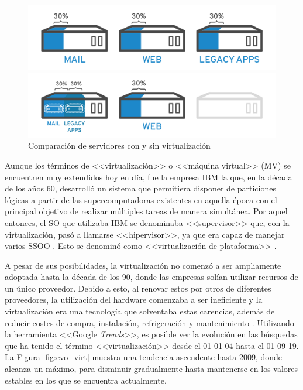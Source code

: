 \begin{figure}
    \centering
    \begin{minipage}{.5\textwidth}
        \centering
        \includegraphics[width=0.9\linewidth]{figures/images/serv_s_virt.png}
    \end{minipage}%
    \begin{minipage}{.5\textwidth}
        \centering
        \includegraphics[width=0.9\linewidth]{figures/images/serv_c_virt.png}
    \end{minipage}
    \caption{Comparación de servidores con y sin virtualización}
    \label{fig:ejemplo_virtu}
\end{figure}

Aunque los términos de <<virtualización>> o <<máquina virtual>> (\acs{MV}) se encuentren muy extendidos hoy en día, fue la empresa IBM la que, en la década de los años 60, desarrolló un sistema que permitiera disponer de particiones lógicas a partir de las supercomputadoras existentes en aquella época con el principal objetivo de realizar múltiples tareas de manera simultánea. Por aquel entonces, el \acf{SO} que utilizaba IBM se denominaba <<supervisor>> que, con la virtualización, pasó a llamarse <<hipervisor>>, ya que era capaz de manejar varios SSOO \cite{josemariagris2012}. Esto se denominó como <<virtualización de plataforma>> \cite{mtimjones2011}.

A pesar de sus posibilidades, la virtualización no comenzó a ser ampliamente adoptada hasta la década de los 90, donde las empresas solían utilizar recursos de un único proveedor. Debido a esto, al renovar estos por otros de diferentes proveedores, la utilización del hardware comenzaba a ser ineficiente  y la virtualización era una tecnología que solventaba estas carencias, además de reducir costes de compra, instalación, refrigeración y mantenimiento \cite{redhat}. Utilizando la herramienta  <<Google \textit{Trends}>>, es posible ver la evolución en las búsquedas que ha tenido el término <<virtualización>> desde el 01-01-04 hasta el 01-09-19. La Figura \ref{fig:evo_virt} muestra una tendencia ascendente hasta 2009, donde alcanza un máximo, para disminuir gradualmente hasta mantenerse en los valores estables en los que se encuentra actualmente.

